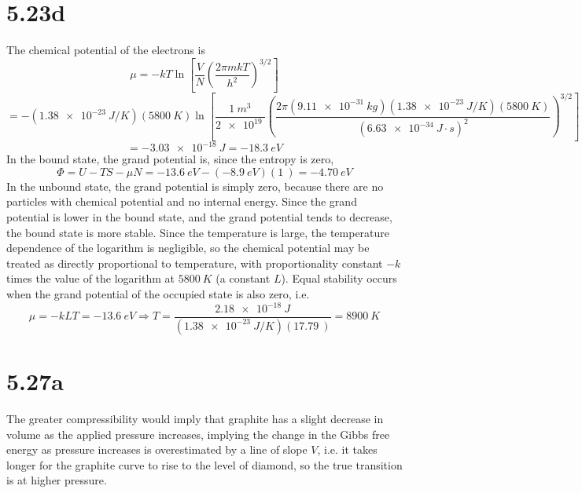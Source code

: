 \documentclass{article}
\begin{document}
\section*{5.23d}
The chemical potential of the electrons is
\[\mu=-kT\ln\left[ \frac{V}{N}\left( \frac{2\pi mkT}{h^{2}} \right)^{3/2} \right]\]
\[=-(\SI{1.38e-23}{J/K})(\SI{5800}{K})\ln\left[ \frac{\SI{1}{m^{3}}}{\SI{2e19}{}}\left( \frac{2\pi(\SI{9.11e-31}{kg})(\SI{1.38e-23}{J/K})(\SI{5800}{K})}{(\SI{6.63e-34}{J\cdot s})^{2}} \right)^{3/2} \right]\]
\[=\SI{-3.03e-18}{J}=\SI{-18.3}{eV}\]
In the bound state, the grand potential is, since the entropy is zero,
\[\Phi=U-TS-\mu N=\SI{-13.6}{eV}-(\SI{-8.9}{eV})(\SI{1}{})=\SI{-4.70}{eV}\]
In the unbound state, the grand potential is simply zero, because there are no particles with chemical potential and no internal energy.
Since the grand potential is lower in the bound state, and the grand potential tends to decrease, the bound state is more stable. Since the temperature is large, the temperature dependence of the logarithm is negligible, so the chemical potential may be treated as directly proportional to temperature, with proportionality constant $-k$ times the value of the logarithm at $\SI{5800}{K}$ (a constant $L$). Equal stability occurs when the grand potential of the occupied state is also zero, i.e.
\[\mu=-kLT=-\SI{13.6}{eV}\Rightarrow T=\frac{\SI{2.18e-18}{J}}{(\SI{1.38e-23}{J/K})(\SI{17.79}{})}=\SI{8900}{K}\]

\section*{5.27a}
The greater compressibility would imply that graphite has a slight decrease in volume as the applied pressure increases, implying the change in the Gibbs free energy as pressure increases is overestimated by a line of slope $V$, i.e. it takes longer for the graphite curve to rise to the level of diamond, so the true transition is at higher pressure.
\end{document}
